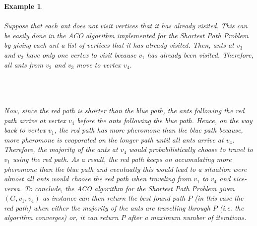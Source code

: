 \documentclass{article}
\newtheorem{example}[definition]{Example}
\begin{document}
\begin{example}
\\\\
Suppose that each ant does not visit vertices that it has already visited. This can be easily done in the ACO algorithm implemented for the Shortest Path Problem by giving each ant a list of vertices that it has already visited. Then, ants at $v_3$ and $v_2$ have only one vertex to visit because $v_1$ has already been visited. Therefore, all ants from $v_2$ and $v_3$ move to vertex $v_4$.\\\\
\\\\
Now, since the red path is shorter than the blue path, the ants following the red path arrive at vertex $v_4$ before the ants following the blue path. Hence, on the way back to vertex $v_1$, the red path has more pheromone than the blue path because, more pheromone is evaporated on the longer path until all ants arrive at $v_4$. Therefore, the majority of the ants at $v_4$ would probabilistically choose to travel to $v_1$ using the red path. As a result, the red path keeps on accumulating more pheromone than the blue path and eventually this would lead to a situation were almost all ants would choose the red path when traveling from $v_1$ to $v_4$ and vice-versa. To conclude, the ACO algorithm for the Shortest Path Problem given $(G, v_1, v_4)$ as instance can then return the best found path $P$ (in this case the red path) when either the majority of the ants are travelling through $P$ (i.e. the algorithm converges) or, it can return $P$ after a maximum number of iterations.  
\end{example}
\end{document}
